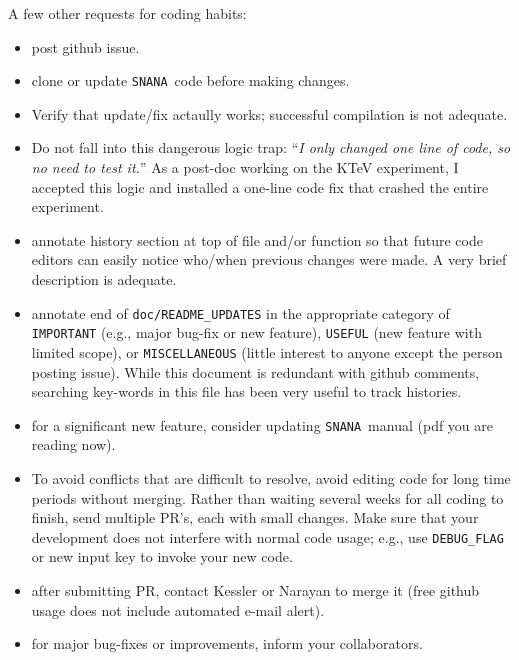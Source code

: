 \documentclass[12pt]{article}
\newcommand{\SNANA}{{\tt SNANA}}
\begin{document}
{A few other requests for coding habits:
\begin{itemize}
   \itemsep0em 
   \item post github issue.
   \item clone or update \SNANA\ code before making changes.
%
   \item Verify that update/fix actaully works;
          successful compilation is not adequate.
%
   \item Do not fall into this dangerous logic trap:
         ``{\it I only changed one line of code, so no need to test it.}'' 
         As a post-doc working on the KTeV experiment, I accepted this 
         logic and installed a one-line code fix that 
         crashed the entire experiment.
%
   \item annotate history section at top of file and/or function so 
         that future code editors can easily notice who/when 
         previous changes were made.
         A very brief description is adequate.
% 
  \item annotate end of {\tt doc/README\_UPDATES} in the appropriate
        category of {\tt IMPORTANT} (e.g., major bug-fix or new feature),
        {\tt USEFUL} (new feature with limited scope), or
        {\tt MISCELLANEOUS} (little interest to anyone
          except the person posting issue).
        While this document is redundant with github comments, 
        searching key-words in this file has been
        very useful to track histories.
% 
   \item for a significant new feature, consider updating \SNANA\ manual
         (pdf you are reading now).
%
   \item To avoid conflicts that are difficult to resolve,
         avoid editing code for long time periods without merging. 
         Rather than waiting several weeks for all coding to finish,
         send multiple PR's, each with small changes.
         Make sure that your development does not
         interfere with normal code usage; 
         e.g., use {\tt DEBUG\_FLAG} or new input key to invoke
         your new code.         
%  
   \item  after submitting PR, contact Kessler or Narayan to merge it
          (free github usage does not include automated e-mail alert).
%
   \item for major bug-fixes or improvements, inform your
         collaborators.
\end{itemize}


\clearpage
}
\end{document}
